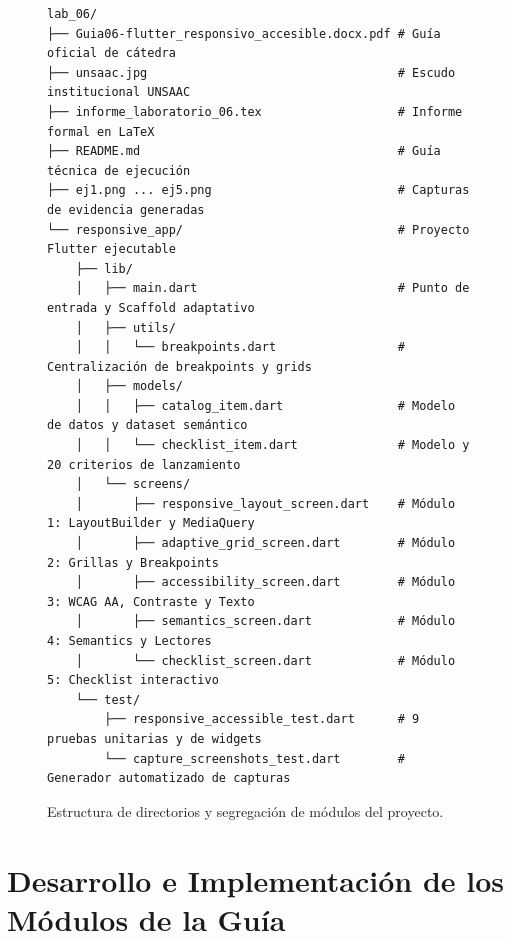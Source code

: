 \documentclass[12pt,a4paper]{article}
\begin{document}
\begin{figure}[H]
\centering
\begin{tcolorbox}[colback=backcolour,colframe=unsaacblue,title=\textbf{Organización del Código Fuente - lab\_06/responsive\_app}]
\small
\begin{verbatim}
lab_06/
├── Guia06-flutter_responsivo_accesible.docx.pdf # Guía oficial de cátedra
├── unsaac.jpg                                   # Escudo institucional UNSAAC
├── informe_laboratorio_06.tex                   # Informe formal en LaTeX
├── README.md                                    # Guía técnica de ejecución
├── ej1.png ... ej5.png                          # Capturas de evidencia generadas
└── responsive_app/                              # Proyecto Flutter ejecutable
    ├── lib/
    │   ├── main.dart                            # Punto de entrada y Scaffold adaptativo
    │   ├── utils/
    │   │   └── breakpoints.dart                 # Centralización de breakpoints y grids
    │   ├── models/
    │   │   ├── catalog_item.dart                # Modelo de datos y dataset semántico
    │   │   └── checklist_item.dart              # Modelo y 20 criterios de lanzamiento
    │   └── screens/
    │       ├── responsive_layout_screen.dart    # Módulo 1: LayoutBuilder y MediaQuery
    │       ├── adaptive_grid_screen.dart        # Módulo 2: Grillas y Breakpoints
    │       ├── accessibility_screen.dart        # Módulo 3: WCAG AA, Contraste y Texto
    │       ├── semantics_screen.dart            # Módulo 4: Semantics y Lectores
    │       └── checklist_screen.dart            # Módulo 5: Checklist interactivo
    └── test/
        ├── responsive_accessible_test.dart      # 9 pruebas unitarias y de widgets
        └── capture_screenshots_test.dart        # Generador automatizado de capturas
\end{verbatim}
\end{tcolorbox}
\caption{Estructura de directorios y segregación de módulos del proyecto.}
\label{fig:estructura}
\end{figure}

\section{Desarrollo e Implementación de los Módulos de la Guía}
\end{document}
